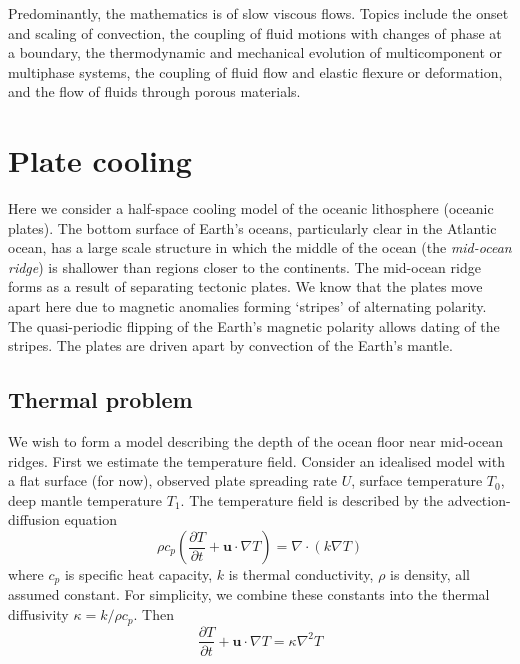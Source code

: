 \documentclass{jknotes}
\begin{document}
Predominantly, the mathematics is of slow viscous flows. Topics include the
onset and scaling of convection, the coupling of fluid motions with changes of
phase at a boundary, the thermodynamic and mechanical evolution of
multicomponent or multiphase systems, the coupling of fluid flow and elastic
flexure or deformation, and the flow of fluids through porous materials. 

\section{Plate cooling}
Here we consider a half-space cooling model of the oceanic lithosphere
(oceanic plates). The bottom surface of Earth's oceans, particularly clear in
the Atlantic ocean, has a large scale structure in which the middle of the
ocean (the \emph{mid-ocean ridge}) is shallower than regions closer to the
continents.  The mid-ocean ridge forms as a result of separating tectonic
plates. We know that the plates move apart here due to magnetic anomalies
forming `stripes' of alternating polarity. The quasi-periodic flipping of the
Earth's magnetic polarity allows dating of the stripes. The plates are driven
apart by convection of the Earth's mantle.

\subsection{Thermal  problem}
We wish to form a model describing the depth of the ocean floor near mid-ocean
ridges. First we estimate the temperature field. Consider an idealised model
with a flat surface (for now), observed plate spreading rate $U$, surface
temperature $T_0$, deep mantle temperature $T_1$.
The temperature field is described by the advection-diffusion equation
\begin{equation}
	\rho c_p \left(\frac{\partial T}{\partial t} + \symbf{u}\cdot\nabla T
	\right) = \nabla \cdot (k \nabla T)
\end{equation}
where $c_p$ is specific heat capacity, $k$ is thermal conductivity, $\rho$ is
density, all assumed constant. For simplicity, we combine these constants into
the thermal diffusivity $\kappa = k/\rho c_p$. Then
\begin{equation}
	\frac{\partial T}{\partial t} + \symbf{u}\cdot\nabla T
	 = \kappa \nabla^2 T
\end{equation}
\end{document}

